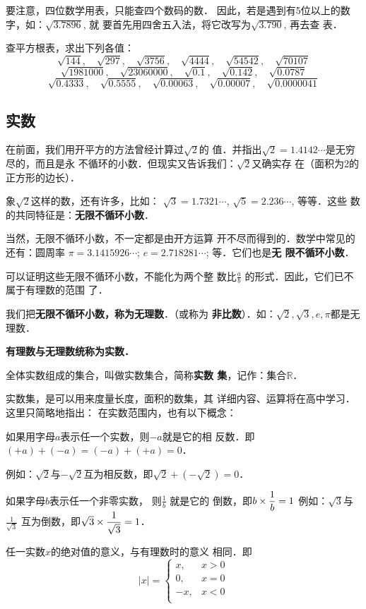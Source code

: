 要注意，四位数学用表，只能查四个数码的数．
因此，若是遇到有5位以上的数字，如：$\sqrt{3.7896}$, 就
要首先用四舍五入法，将它改写为$\sqrt{3.790}$, 再去查
表．

\begin{ex}
    查平方根表，求出下列各值：
\[\sqrt{144},\quad \sqrt{297},\quad \sqrt{3756},\quad \sqrt{4444},\quad \sqrt{54542},\quad \sqrt{70107} \]
\[\sqrt{1981000},\quad \sqrt{23060000},\quad \sqrt{0.1},\quad \sqrt{0.142},\quad \sqrt{0.0787} \]
\[\sqrt{0.4333},\quad \sqrt{0.5555},\quad \sqrt{0.00063},\quad \sqrt{0.00007},\quad \sqrt{0.0000041} \]
\end{ex}

\subsection{实数}
在前面，我们用开平方的方法曾经计算过$\sqrt{2}$的
值．并指出$\sqrt{2}=1.4142\cdots$是无穷尽的，而且是永
不循环的小数．但现实又告诉我们：$\sqrt{2}$又确实存
在（面积为2的正方形的边长）．

象$\sqrt{2}$这样的数，还有许多，比如：
$\sqrt{3}=1.7321\cdots$, $\sqrt{5}=2.236\cdots$, 等等．这些
数的共同特征是：\textbf{无限不循环小数}．

当然，无限不循环小数，不一定都是由开方运算
开不尽而得到的．数学中常见的还有：圆周率
$\pi=3.1415926\cdots$; $e=2.718281\cdots$; 等．它们也是\textbf{无
限不循环小数}．

可以证明这些无限不循环小数，不能化为两个整
数比$\frac{a}{b}$
的形式．因此，它们已不属于有理数的范围
了．

我们把\textbf{无限不循环小数，称为无理数}．（或称为
\textbf{非比数}）．如：$\sqrt{2},\sqrt{3},e,\pi$都是无理数．

\textbf{有理数与无理数统称为实数．}

全体实数组成的集合，叫做实数集合，简称\textbf{实数
集}，记作：集合$\mathbb{R}$．

实数集，是可以用来度量长度，面积的数集，其
详细内容、运算将在高中学习．这里只简略地指出：
在实数范围内，也有以下概念：

如果用字母$a$表示任一个实数，则$-a$就是它的相
反数．即$(+a)+(-a)=(-a)+(+a)=0$．

例如：$\sqrt{2}$与$-\sqrt{2}$互为相反数，即$\sqrt{2}+\left(-\sqrt{2}\right)=0$．

如果字母$b$表示任一个非零实数，
则$\frac{1}{b}$
就是它的
倒数，即$b\times\dfrac{1}{b}=1$
例如：$\sqrt{3}$与$\frac{1}{\sqrt{3}}$
互为倒数，即$\sqrt{3}\times \dfrac{1}{\sqrt{3}}=1$．

任一实数$x$的绝对值的意义，与有理数时的意义
相同．即
\[|x|=\begin{cases}
    x, & x>0\\
    0, & x=0\\
    -x, & x<0\\  
\end{cases}\]

